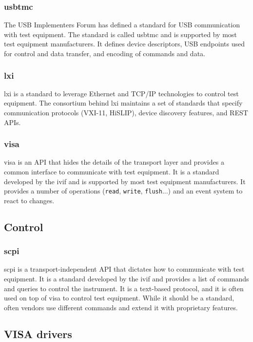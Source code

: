 \documentclass[a4paper,english,twoside,10pt]{article}
\begin{document}
\subsubsection{\texorpdfstring{\gls{usbtmc}}{USB-TMC}}\label{sec:usbtmc}
The USB Implementers Forum has defined a standard for USB communication with test equipment. The standard is called \gls{usbtmc} and is supported by most test equipment manufacturers. It defines device descriptors, USB endpoints used for control and data transfer, and encoding of commands and data.

\subsubsection{\texorpdfstring{\gls{lxi}}{LXI}}\label{sec:lxi}
\gls{lxi} is a standard to leverage Ethernet and TCP/IP technologies to control test equipment. The consortium behind \gls{lxi} maintains a set of standards that specify communication protocols (VXI-11, HiSLIP), device discovery features, and REST APIs.

\subsubsection{\texorpdfstring{\gls{visa}}{VISA}}
\gls{visa} is an API that hides the details of the transport layer and provides a common interface to communicate with test equipment. It is a standard developed by the \gls{ivif} and is supported by most test equipment manufacturers. It provides a number of operations (\texttt{read}, \texttt{write}, \texttt{flush}...) and an event system to react to changes.

\subsection{Control}
\subsubsection{\texorpdfstring{\gls{scpi}}{SCPI}}\label{sec:scpi}
\gls{scpi} is a transport-independent API that dictates how to communicate with test equipment. It is a standard developed by the \gls{ivif} and provides a list of commands and queries to control the instrument. It is a text-based protocol, and it is often used on top of \gls{visa} to control test equipment. While it should be a standard, often vendors use different commands and extend it with proprietary features.

\subsection{VISA drivers}
\end{document}
